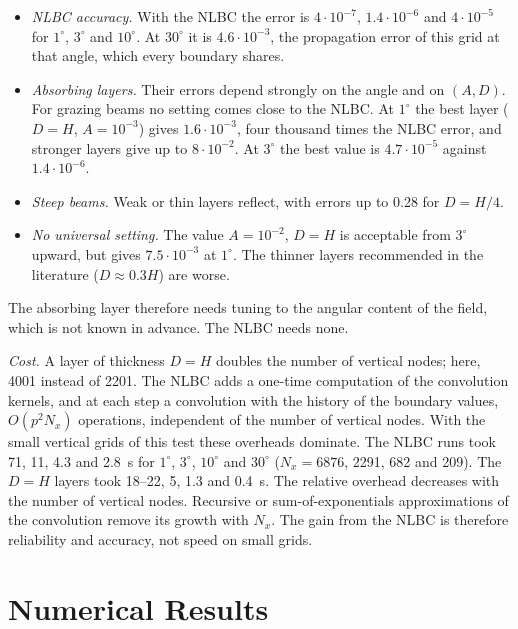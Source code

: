 \documentclass[journal]{IEEEtran}
\begin{document}
\begin{itemize}
\item \emph{NLBC accuracy.} With the NLBC the error is $4\cdot10^{-7}$,
$1.4\cdot10^{-6}$ and $4\cdot10^{-5}$ for $1^\circ$, $3^\circ$ and $10^\circ$.
At $30^\circ$ it is $4.6\cdot10^{-3}$, the propagation error of this grid at
that angle, which every boundary shares.
\item \emph{Absorbing layers.} Their errors depend strongly on the angle and on
$(A,D)$. For grazing beams no setting comes close to the NLBC. At $1^\circ$ the
best layer ($D=H$, $A=10^{-3}$) gives $1.6\cdot10^{-3}$, four thousand times the
NLBC error, and stronger layers give up to $8\cdot10^{-2}$. At $3^\circ$ the
best value is $4.7\cdot10^{-5}$ against $1.4\cdot10^{-6}$.
\item \emph{Steep beams.} Weak or thin layers reflect, with errors up to 0.28
for $D=H/4$.
\item \emph{No universal setting.} The value $A=10^{-2}$, $D=H$ is acceptable
from $3^\circ$ upward, but gives $7.5\cdot10^{-3}$ at $1^\circ$. The thinner
layers recommended in the literature ($D\approx0.3H$) are worse.
\end{itemize}
The absorbing layer therefore needs tuning to the angular content of the field,
which is not known in advance. The NLBC needs none.

\emph{Cost.} A layer of thickness $D=H$ doubles the number of vertical nodes;
here, 4001 instead of 2201. The NLBC adds a one-time computation of the
convolution kernels, and at each step a convolution with the history of the
boundary values, $O(p^2N_x)$ operations, independent of the number of vertical
nodes. With the small vertical grids of this test these overheads dominate. The
NLBC runs took 71, 11, 4.3 and \SI{2.8}{s} for $1^\circ$, $3^\circ$,
$10^\circ$ and $30^\circ$ ($N_x=6876$, 2291, 682 and 209). The $D=H$ layers
took 18--22, 5, 1.3 and \SI{0.4}{s}. The relative overhead decreases with the
number of vertical nodes. Recursive or sum-of-exponentials approximations of
the convolution \cite{wangr2017dnlbc3d,arnold_ehrhardt1998jcp} remove its growth
with $N_x$. The gain from the NLBC is therefore reliability and accuracy, not
speed on small grids.

\section{Numerical Results}\label{sec:results}
\end{document}
